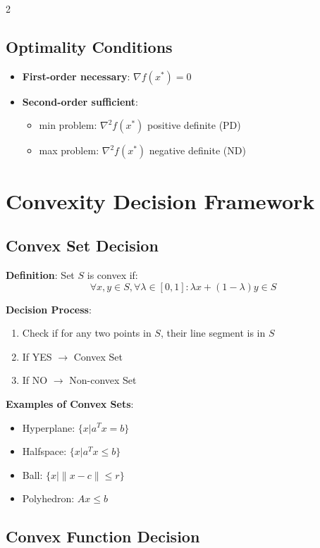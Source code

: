 \documentclass[10pt,a4paper,landscape]{article}
\begin{document}
\begin{multicols}{2}
\subsection*{Optimality Conditions}
\begin{itemize}
\item \textbf{First-order necessary}: $\nabla f(x^*) = 0$
\item \textbf{Second-order sufficient}: 
  \begin{itemize}
  \item min problem: $\nabla^2 f(x^*)$ positive definite (PD)
  \item max problem: $\nabla^2 f(x^*)$ negative definite (ND)
  \end{itemize}
\end{itemize}

\columnbreak

\section*{Convexity Decision Framework}

\subsection*{Convex Set Decision}

\textbf{Definition}: Set $S$ is convex if:
$$\forall x,y \in S, \forall \lambda \in [0,1]: \lambda x + (1-\lambda)y \in S$$

\textbf{Decision Process}:
\begin{enumerate}
\item Check if for any two points in $S$, their line segment is in $S$
\item If YES $\rightarrow$ Convex Set
\item If NO $\rightarrow$ Non-convex Set
\end{enumerate}

\textbf{Examples of Convex Sets}:
\begin{itemize}
\item Hyperplane: $\{x | a^T x = b\}$
\item Halfspace: $\{x | a^T x \leq b\}$
\item Ball: $\{x | \|x - c\| \leq r\}$
\item Polyhedron: $Ax \leq b$
\end{itemize}

\subsection*{Convex Function Decision}


\end{multicols}
\end{document}
